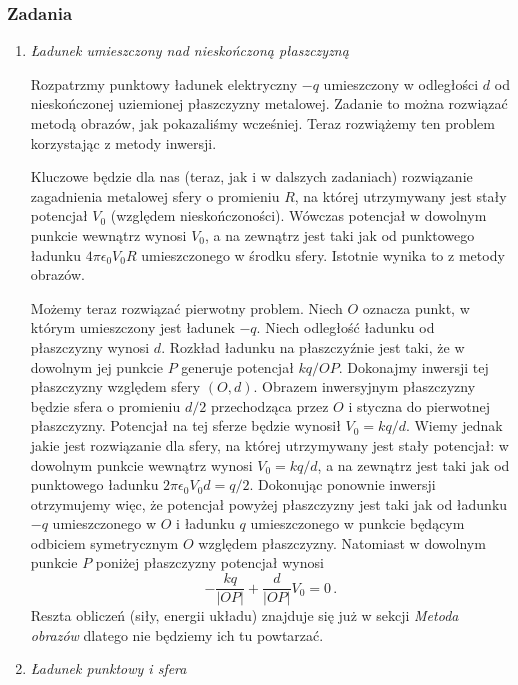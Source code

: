 \documentclass[../main.tex]{subfiles}
\begin{document}
\subsubsection*{Zadania}
\begin{enumerate}
    \item \textit{Ładunek umieszczony nad nieskończoną płaszczyzną}
    \medskip
    
    Rozpatrzmy punktowy ładunek elektryczny \(-q\) umieszczony w odległości \(d\) od nieskończonej
    uziemionej płaszczyzny metalowej. Zadanie to można rozwiązać metodą obrazów, jak pokazaliśmy
    wcześniej. Teraz rozwiążemy ten problem korzystając z metody inwersji.
    \medskip
    
    Kluczowe będzie dla nas (teraz, jak i w dalszych zadaniach) rozwiązanie zagadnienia metalowej
    sfery o promieniu \(R\), na której utrzymywany jest stały potencjał \(V_0\) (względem
    nieskończoności). Wówczas potencjał w dowolnym punkcie wewnątrz wynosi \(V_0\), a na zewnątrz
    jest taki jak od punktowego ładunku \(4\pi\epsilon_0V_0R\) umieszczonego w środku sfery.
    Istotnie wynika to z metody obrazów.
    \medskip
    
    Możemy teraz rozwiązać pierwotny problem. Niech \(O\) oznacza punkt, w którym umieszczony jest
    ładunek \(-q\). Niech odległość ładunku od płaszczyzny wynosi \(d\). Rozkład ładunku na
    płaszczyźnie jest taki, że w dowolnym jej punkcie \(P\) generuje potencjał \(kq/OP\). Dokonajmy
    inwersji tej płaszczyzny względem sfery \((O,d)\). Obrazem inwersyjnym płaszczyzny będzie sfera
    o promieniu \(d/2\) przechodząca przez \(O\) i styczna do pierwotnej płaszczyzny. Potencjał na
    tej sferze będzie wynosił \(V_0=kq/d\). Wiemy jednak jakie jest rozwiązanie dla sfery, na której
    utrzymywany jest stały potencjał: w dowolnym punkcie wewnątrz wynosi \(V_0=kq/d\), a na zewnątrz
    jest taki jak od punktowego ładunku \(2\pi\epsilon_0V_0d=q/2\). Dokonując ponownie inwersji
    otrzymujemy więc, że potencjał powyżej płaszczyzny jest taki jak od ładunku \(-q\) umieszczonego
    w \(O\) i ładunku \(q\) umieszczonego w punkcie będącym odbiciem symetrycznym \(O\) względem
    płaszczyzny. Natomiast w dowolnym punkcie \(P\) poniżej płaszczyzny potencjał wynosi
    \begin{equation*}
        -\frac{kq}{|OP|}+\frac{d}{|OP|}V_0=0\,.
    \end{equation*}
    Reszta obliczeń (siły, energii układu) znajduje się już w sekcji \textit{Metoda obrazów} dlatego
    nie będziemy ich tu powtarzać.
    \item \textit{Ładunek punktowy i sfera}
    \medskip
    

\end{enumerate}
\end{document}
